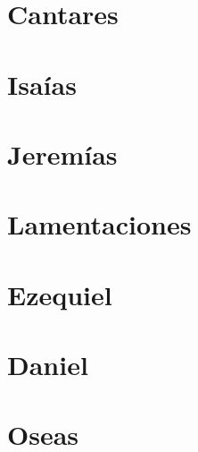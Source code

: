 \chapter{Cantares}
\begin{multicols}{2}
  \raggedcolumns
  \parskip=0pt \relax
  
\end{multicols}

\chapter{Isaías}
\begin{multicols}{2}
  \raggedcolumns
  \parskip=0pt \relax
  
\end{multicols}

\chapter{Jeremías}
\begin{multicols}{2}
  \raggedcolumns
  \parskip=0pt \relax
  
\end{multicols}

\chapter{Lamentaciones}
\begin{multicols}{2}
  \raggedcolumns
  \parskip=0pt \relax
  
\end{multicols}

\chapter{Ezequiel}
\begin{multicols}{2}
  \raggedcolumns
  \parskip=0pt \relax
  
\end{multicols}

\chapter{Daniel}
\begin{multicols}{2}
  \raggedcolumns
  \parskip=0pt \relax
  
\end{multicols}

\chapter{Oseas}
\begin{multicols}{2}
  \raggedcolumns
  \parskip=0pt \relax
  
\end{multicols}

